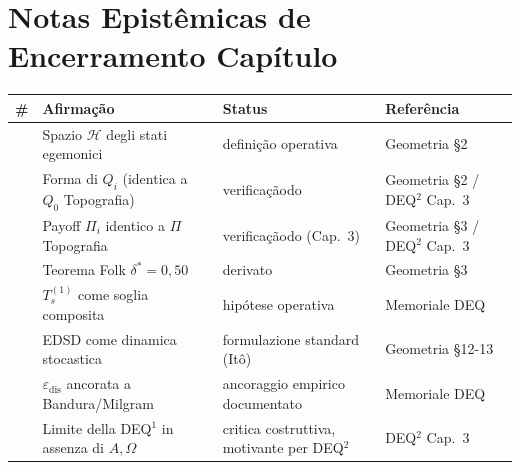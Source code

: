 \section{Notas Epistêmicas de Encerramento
Capítulo}\label{note-epistemiche-di-chiusura-capítulo}

{\def\LTcaptype{none} %
{\small\begin{longtable}[]{@{}
  >{\raggedright\arraybackslash}p{}
  >{\raggedright\arraybackslash}p{}
  >{\raggedright\arraybackslash}p{}
  >{\raggedright\arraybackslash}p{}@{}}
\toprule\noalign{}
\begin{minipage}[b]{\linewidth}\raggedright
\#
\end{minipage} & \begin{minipage}[b]{\linewidth}\raggedright
Afirmação
\end{minipage} & \begin{minipage}[b]{\linewidth}\raggedright
Status
\end{minipage} & \begin{minipage}[b]{\linewidth}\raggedright
Referência
\end{minipage} \\
\midrule\noalign{}
\endhead
\bottomrule\noalign{}
\endlastfoot
1 & Spazio \(\mathcal{H}\) degli stati egemonici & \Proved{} definição
operativa & Geometria \S{}2 \\
2 & Forma di \(Q_i\) (identica a \(Q_0\) Topografia) & \Proved{}
verificaçãodo & Geometria \S{}2 / DEQ$^2$ Cap.~3 \\
3 & Payoff \(\Pi_i\) identico a $\Pi$ Topografia & \Proved{} verificaçãodo
(Cap.~3) & Geometria \S{}3 / DEQ$^2$ Cap.~3 \\
4 & Teorema Folk \(\delta^* = 0{,}50\) & \Proved{} derivato & Geometria
\S{}3 \\
5 & \(T_s^{(1)}\) come soglia composita & \Hypoth{} hipótese operativa &
Memoriale DEQ \\
6 & EDSD come dinamica stocastica & \Proved{} formulazione standard
(Itô) & Geometria \S{}12-13 \\
7 & \(\varepsilon_{\text{dis}}\) ancorata a Bandura/Milgram & \Proved{}
ancoraggio empirico documentato & Memoriale DEQ \\
8 & Limite della DEQ$^1$ in assenza di \(A, \Omega\) & \Conj{} critica
costruttiva, motivante per DEQ$^2$ & DEQ$^2$ Cap.~3 \\
\end{longtable}}
}


